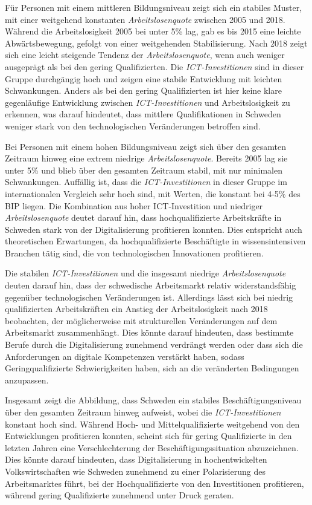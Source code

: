 Für Personen mit einem mittleren Bildungsniveau zeigt sich ein stabiles Muster, mit 
einer weitgehend konstanten \textit{Arbeitslosenquote} zwischen 2005 und 2018. Während die 
Arbeitslosigkeit 2005 bei unter 5\% lag, gab es bis 2015 eine leichte Abwärtsbewegung, 
gefolgt von einer weitgehenden Stabilisierung. Nach 2018 zeigt sich eine leicht steigende 
Tendenz der \textit{Arbeitslosenquote}, wenn auch weniger ausgeprägt als bei den gering 
Qualifizierten. Die \textit{\ac{ICT}-Investitionen} sind in dieser Gruppe durchgängig 
hoch und zeigen eine stabile Entwicklung mit leichten Schwankungen. Anders als bei den 
gering Qualifizierten ist hier keine klare gegenläufige Entwicklung zwischen 
\textit{\ac{ICT}-Investitionen} und Arbeitslosigkeit zu erkennen, was darauf hindeutet, 
dass mittlere Qualifikationen in Schweden weniger stark von den technologischen 
Veränderungen betroffen sind.

Bei Personen mit einem hohen Bildungsniveau zeigt sich über den gesamten Zeitraum 
hinweg eine extrem niedrige \textit{Arbeitslosenquote}. Bereits 2005 lag sie unter 5\% 
und blieb über den gesamten Zeitraum stabil, mit nur minimalen Schwankungen. Auffällig 
ist, dass die \textit{\ac{ICT}-Investitionen} in dieser Gruppe im internationalen Vergleich 
sehr hoch sind, mit Werten, die konstant bei 4-5\% des \ac{BIP} liegen. Die Kombination aus 
hoher \ac{ICT}-Investition und niedriger \textit{Arbeitslosenquote} deutet darauf hin, dass 
hochqualifizierte Arbeitskräfte in Schweden stark von der Digitalisierung profitieren 
konnten. Dies entspricht auch theoretischen Erwartungen, da hochqualifizierte 
Beschäftigte in wissensintensiven Branchen tätig sind, die von technologischen 
Innovationen profitieren.

Die stabilen \textit{\ac{ICT}-Investitionen} und die insgesamt niedrige 
\textit{Arbeitslosenquote} deuten darauf hin, dass der schwedische Arbeitsmarkt relativ 
widerstandsfähig gegenüber technologischen Veränderungen ist. Allerdings lässt sich bei 
niedrig qualifizierten Arbeitskräften ein Anstieg der Arbeitslosigkeit nach 2018 beobachten, 
der möglicherweise mit strukturellen Veränderungen auf dem Arbeitsmarkt zusammenhängt. 
Dies könnte darauf hindeuten, dass bestimmte Berufe durch die Digitalisierung 
zunehmend verdrängt werden oder dass sich die Anforderungen an digitale Kompetenzen 
verstärkt haben, sodass Geringqualifizierte Schwierigkeiten haben, sich an die 
veränderten Bedingungen anzupassen.

Insgesamt zeigt die Abbildung, dass Schweden ein stabiles Beschäftigungsniveau über 
den gesamten Zeitraum hinweg aufweist, wobei die \textit{\ac{ICT}-Investitionen} 
konstant hoch sind. Während Hoch- und Mittelqualifizierte weitgehend von den 
Entwicklungen profitieren konnten, scheint sich für gering Qualifizierte in den 
letzten Jahren eine Verschlechterung der Beschäftigungssituation abzuzeichnen. Dies 
könnte darauf hindeuten, dass Digitalisierung in hochentwickelten Volkswirtschaften 
wie Schweden zunehmend zu einer Polarisierung des Arbeitsmarktes führt, bei der 
Hochqualifizierte von den Investitionen profitieren, während gering Qualifizierte 
zunehmend unter Druck geraten.


